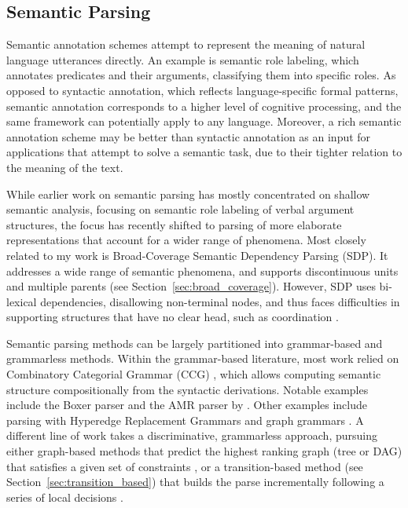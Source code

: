 \documentclass[12pt]{article}
\newcommand{\secref}[1]{Section~\ref{#1}}
\begin{document}
\subsection{Semantic Parsing}

Semantic annotation schemes attempt to represent the meaning of natural
language utterances directly. An example is semantic role
labeling\cite{baker1998framenet}\cite{paass2014semantic}, which annotates
predicates and their arguments, classifying them into specific roles. As
opposed to syntactic annotation, which reflects language-specific formal
patterns, semantic annotation corresponds to a higher level of cognitive
processing, and the same framework can potentially apply to any language.
Moreover, a rich semantic annotation scheme may be better than
syntactic annotation as an input for applications that attempt to solve a
semantic task, due to their tighter relation to the meaning of the text.

While earlier work on semantic parsing has mostly concentrated on shallow semantic analysis,
focusing on semantic role labeling of verbal argument structures,
the focus has recently shifted to parsing of more elaborate representations that account
for a wider range of phenomena. 
Most closely related to my work is Broad-Coverage Semantic Dependency Parsing (SDP).
It addresses a wide range of semantic phenomena,
and supports discontinuous units and multiple parents
(see \secref{sec:broad_coverage}).
However, SDP uses
bi-lexical dependencies, disallowing non-terminal nodes, and thus faces difficulties in supporting
structures that have no clear head, such as coordination \cite{Ivanova2012who}.

Semantic parsing methods can be largely partitioned into grammar-based and grammarless methods.
Within the grammar-based literature, most work relied on Combinatory Categorial Grammar (CCG)
\cite{Steedman:00}, which allows computing semantic structure compositionally from the
syntactic derivations. Notable examples include the Boxer parser \cite{bos2005towards}
and the AMR parser by \cite{artzi2015broad}.
Other examples include parsing with Hyperedge Replacement Grammars
\cite{jones2012semantics,chiang2013parsing,peng2015synchronous} and
graph grammars \cite{koller2015semantic}.
A different line of work takes a discriminative, grammarless approach,
pursuing either graph-based methods that predict the highest ranking graph
(tree or DAG) that satisfies a given set of constraints
\cite[for AMR parsing]{flanigan2014discriminative},
or a transition-based method (see \secref{sec:transition_based})
that builds the parse incrementally following a series of local
decisions \cite{Nivre03anefficient}.
\end{document}
